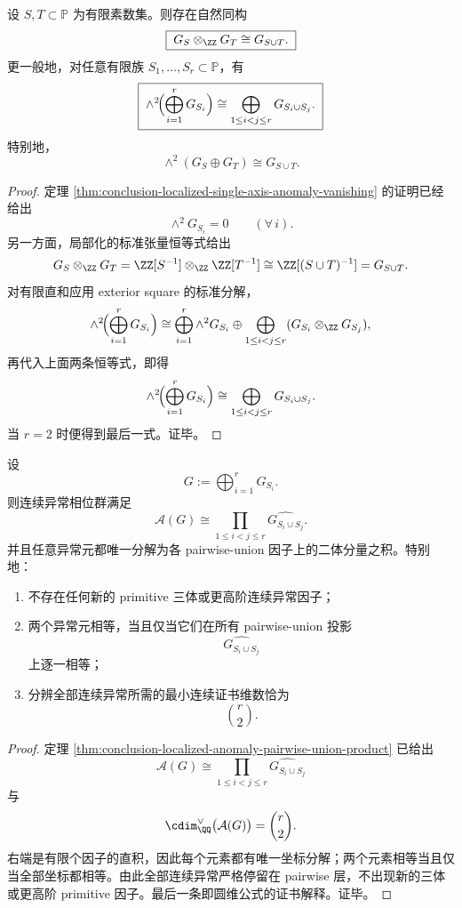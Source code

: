 \begin{theorem}\label{thm:conclusion-localized-pairwise-union-wedge-bilinearization}
设 \(S,T\subset\mathbb P\) 为有限素数集。则存在自然同构
\[
\boxed{\;
G_S\otimes_{\ZZ}G_T\cong G_{S\cup T}.\;}
\]
更一般地，对任意有限族 \(S_1,\dots,S_r\subset\mathbb P\)，有
\[
\boxed{\;
\wedge^2\!\Bigl(\bigoplus_{i=1}^r G_{S_i}\Bigr)
\cong
\bigoplus_{1\le i<j\le r}G_{S_i\cup S_j}.\;}
\]
特别地，
\[
\boxed{\;
\wedge^2(G_S\oplus G_T)\cong G_{S\cup T}.\;}
\]
\end{theorem}
\begin{proof}
定理 \ref{thm:conclusion-localized-single-axis-anomaly-vanishing} 的证明已经给出
\[
\wedge^2G_{S_i}=0
\qquad(\forall\,i).
\]
另一方面，局部化的标准张量恒等式给出
\[
G_S\otimes_{\ZZ}G_T
=
\ZZ[S^{-1}]\otimes_{\ZZ}\ZZ[T^{-1}]
\cong
\ZZ[(S\cup T)^{-1}]
=
G_{S\cup T}.
\]
对有限直和应用 exterior square 的标准分解，
\[
\wedge^2\!\Bigl(\bigoplus_{i=1}^r G_{S_i}\Bigr)
\cong
\bigoplus_{i=1}^r \wedge^2G_{S_i}
\oplus
\bigoplus_{1\le i<j\le r}(G_{S_i}\otimes_{\ZZ}G_{S_j}),
\]
再代入上面两条恒等式，即得
\[
\wedge^2\!\Bigl(\bigoplus_{i=1}^r G_{S_i}\Bigr)
\cong
\bigoplus_{1\le i<j\le r}G_{S_i\cup S_j}.
\]
当 \(r=2\) 时便得到最后一式。证毕。
\end{proof}

\begin{corollary}[有限局部化异常的二体完备性]\label{cor:conclusion-localized-anomaly-pairwise-completeness}
设
\[
G:=\bigoplus_{i=1}^r G_{S_i}.
\]
则连续异常相位群满足
\[
\mathcal A(G)\cong \prod_{1\le i<j\le r}\widehat{G_{S_i\cup S_j}}.
\]
并且任意异常元都唯一分解为各 pairwise-union 因子上的二体分量之积。特别地：
\begin{enumerate}
\normalfont
  \item 不存在任何新的 primitive 三体或更高阶连续异常因子；
  \item 两个异常元相等，当且仅当它们在所有 pairwise-union 投影
  \[
  \widehat{G_{S_i\cup S_j}}
  \]
  上逐一相等；
  \item 分辨全部连续异常所需的最小连续证书维数恰为
  \[
  \binom r2.
  \]
\end{enumerate}
\end{corollary}
\begin{proof}
定理 \ref{thm:conclusion-localized-anomaly-pairwise-union-product} 已给出
\[
\mathcal A(G)\cong \prod_{1\le i<j\le r}\widehat{G_{S_i\cup S_j}}
\]
与
\[
\cdim_{\QQ}^{\vee}\bigl(\mathcal A(G)\bigr)=\binom r2.
\]
右端是有限个因子的直积，因此每个元素都有唯一坐标分解；两个元素相等当且仅当全部坐标都相等。由此全部连续异常严格停留在 pairwise 层，不出现新的三体或更高阶 primitive 因子。最后一条即圆维公式的证书解释。证毕。
\end{proof}


